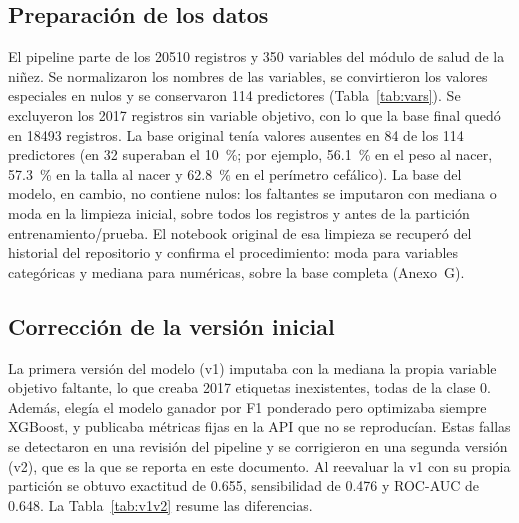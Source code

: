 \subsection{Preparación de los datos}
El pipeline parte de los \num{20510} registros y 350 variables del módulo de salud de la niñez. Se normalizaron los nombres de las variables, se convirtieron los valores especiales en nulos y se conservaron 114 predictores (Tabla~\ref{tab:vars}). Se excluyeron los \num{2017} registros sin variable objetivo, con lo que la base final quedó en \num{18493} registros. La base original tenía valores ausentes en 84 de los 114 predictores (en 32 superaban el \SI{10}{\percent}; por ejemplo, \SI{56.1}{\percent} en el peso al nacer, \SI{57.3}{\percent} en la talla al nacer y \SI{62.8}{\percent} en el perímetro cefálico). La base del modelo, en cambio, no contiene nulos: los faltantes se imputaron con mediana o moda en la limpieza inicial, sobre todos los registros y antes de la partición entrenamiento/prueba. El notebook original de esa limpieza se recuperó del historial del repositorio y confirma el procedimiento: moda para variables categóricas y mediana para numéricas, sobre la base completa (Anexo~G).

\subsection{Corrección de la versión inicial}
La primera versión del modelo (v1) imputaba con la mediana la propia variable objetivo faltante, lo que creaba \num{2017} etiquetas inexistentes, todas de la clase 0. Además, elegía el modelo ganador por F1 ponderado pero optimizaba siempre XGBoost, y publicaba métricas fijas en la API que no se reproducían. Estas fallas se detectaron en una revisión del pipeline y se corrigieron en una segunda versión (v2), que es la que se reporta en este documento. Al reevaluar la v1 con su propia partición se obtuvo exactitud de 0.655, sensibilidad de 0.476 y ROC-AUC de 0.648. La Tabla~\ref{tab:v1v2} resume las diferencias.

